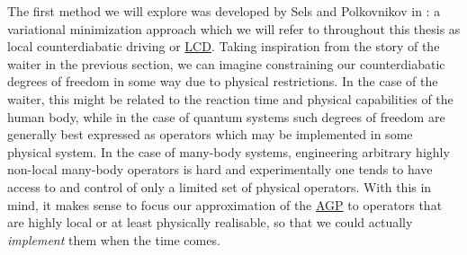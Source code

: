 \documentclass[a4paper,oneside,11pt]{book}
\newcommand{\acrref}[1]{\hyperref[acr:#1]{#1}}
\begin{document}
    The first method we will explore was developed by Sels and Polkovnikov in \cite{sels_minimizing_2017}: a variational minimization approach which we will refer to throughout this thesis as local counterdiabatic driving or \acrref{LCD}. Taking inspiration from the story of the waiter in the previous section, we can imagine constraining our counterdiabatic degrees of freedom in some way due to physical restrictions. In the case of the waiter, this might be related to the reaction time and physical capabilities of the human body, while in the case of quantum systems such degrees of freedom are generally best expressed as operators which may be implemented in some physical system. In the case of many-body systems, engineering arbitrary highly non-local many-body operators is hard and experimentally one tends to have access to and control of only a limited set of physical operators. With this in mind, it makes sense to focus our approximation of the \acrref{AGP} to operators that are highly local or at least physically realisable, so that we could actually \emph{implement} them when the time comes.
\end{document}

